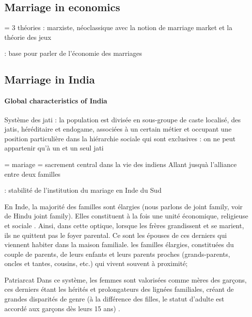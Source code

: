 \documentclass[a4paper, 11pt, onecolumn]{article}
\begin{document}
\citep{Gupta1972}

\citep{Anukriti2018a}





	\subsection{Marriage in economics}

\cite{Grossbard1999a, Grossbard1999b} = 3 théories : marxiste, néoclassique avec la notion de marriage market et la théorie des jeux

\cite{Grossbard1993}

\cite{Becker1973} : base pour parler de l'économie des marriages


	\subsection{Marriage in India}

\paragraph{Global characteristics of India}
Système des jati : la population est divisée en sous-groupe de caste localisé, des jatis, héréditaire et endogame, associées à un certain métier et occupant une position particulière dans la hiérarchie sociale qui sont exclusives : on ne peut appartenir qu’à un et un seul jati

\cite{Aiyar1937} = mariage = sacrement central dans la vie des indiens
Allant jusquà l'alliance entre deux familles \citep{Sheela2003}

\cite{James2015} : stabilité de l'institution du mariage en Inde du Sud

En Inde, la majorité des familles sont élargies (nous parlons de joint family, voir de Hindu joint
family). Elles constituent à la fois une unité économique, religieuse et sociale \citep{Chandrasekhar1943}. Ainsi, dans cette optique, lorsque les frères grandissent et se marient, ils ne quittent
pas le foyer parental. Ce sont les épouses de ces derniers qui viennent habiter dans la maison
familiale.
les familles élargies, constituées du couple de parents, de leurs enfants et leurs parents
proches (grands-parents, oncles et tantes, cousins, etc.) qui vivent souvent à proximité;

Patriarcat
Dans ce système, les femmes sont valorisées
comme mères des garçons, ces derniers étant les hérités et prolongateurs des lignées familiales,
créant de grandes disparités de genre (à la différence des filles, le statut d’adulte est accordé
aux garçons dès leurs 15 ans) \citep{Marius2017}.
\end{document}
